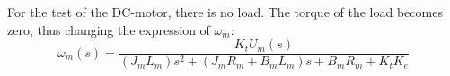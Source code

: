 For the test of the DC-motor, there is no load. The torque of the load becomes zero, thus changing the expression of $\omega_m$: 
\begin{equation}
	\omega_m(s) = \frac{K_tU_m(s)}{(J_mL_m)s^2 + (J_mR_m + B_mL_m)s + B_mR_m + K_tK_e}
\end{equation}









